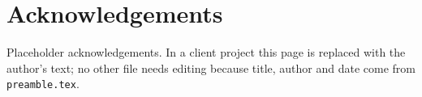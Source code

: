 \chapter*{Acknowledgements}
Placeholder acknowledgements. In a client project this page is replaced with the author's text; no other file needs editing because title, author and date come from \texttt{preamble.tex}.
\clearpage
